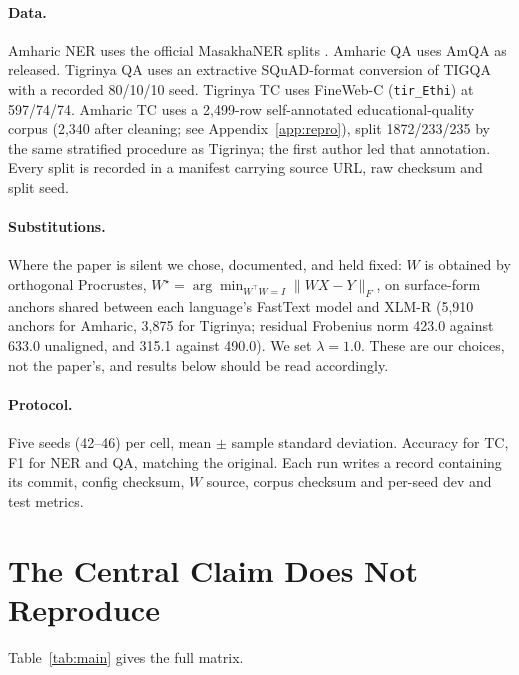 \documentclass[11pt]{article}
\begin{document}
\paragraph{Data.} Amharic NER uses the official MasakhaNER splits
\citep{adelani-etal-2021-masakhaner}. Amharic QA uses AmQA
\citep{taffa-etal-2024-amqa} as released. Tigrinya QA uses an extractive
SQuAD-format conversion of TIGQA with a recorded 80/10/10 seed. Tigrinya TC
uses FineWeb-C (\texttt{tir\_Ethi}) at 597/74/74. Amharic TC uses a
2{,}499-row self-annotated educational-quality corpus (2{,}340 after
cleaning; see Appendix~\ref{app:repro}), split
1872/233/235 by the same stratified procedure as Tigrinya; the first author
led that annotation. Every split is recorded in a manifest carrying source
URL, raw checksum and split seed.

\paragraph{Substitutions.} Where the paper is silent we chose, documented,
and held fixed: $W$ is obtained by orthogonal Procrustes,
$W^\star = \arg\min_{W^\top W = I} \lVert WX - Y\rVert_F$, on surface-form
anchors shared between each language's FastText model and XLM-R (5{,}910
anchors for Amharic, 3{,}875 for Tigrinya; residual Frobenius norm 423.0
against 633.0 unaligned, and 315.1 against 490.0). We set $\lambda = 1.0$.
These are our choices, not the paper's, and results below should be read
accordingly.

\paragraph{Protocol.} Five seeds (42--46) per cell, mean $\pm$ sample
standard deviation. Accuracy for TC, F1 for NER and QA, matching the
original. Each run writes a record containing its commit, config checksum,
$W$ source, corpus checksum and per-seed dev and test metrics.

\section{The Central Claim Does Not Reproduce}
\label{sec:results}

Table~\ref{tab:main} gives the full matrix.
\end{document}
